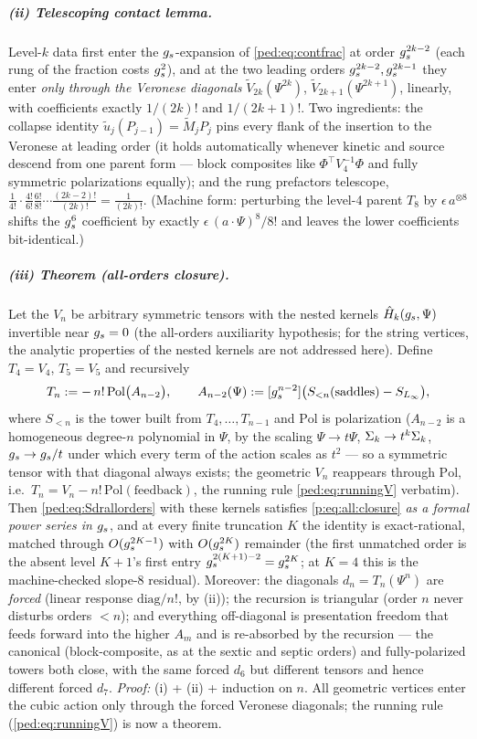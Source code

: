 \subparagraph{(ii) Telescoping contact lemma.} Level-$k$ data first enter the
$g_s$-expansion of \eqref{ped:eq:contfrac} at order $g_s^{2k-2}$ (each rung of the
fraction costs $g_s^2$), and at the two leading orders $g_s^{2k-2},g_s^{2k-1}$ they
enter \emph{only through the Veronese diagonals} $\tilde V_{2k}(\Psi^{2k})$,
$\tilde V_{2k+1}(\Psi^{2k+1})$, linearly, with coefficients exactly $1/(2k)!$ and
$1/(2k+1)!$. Two ingredients: the collapse identity $\tilde u_j(P_{j-1})=\tilde M_j
P_j$ pins every flank of the insertion to the Veronese at leading order (it holds
automatically whenever kinetic and source descend from one parent form --- block
composites like $\Phi^\top V_4^{-1}\Phi$ and fully symmetric polarizations equally);
and the rung prefactors telescope,
$\tfrac1{4!}\cdot\tfrac{4!}{6!}\tfrac{6!}{8!}\cdots\tfrac{(2k-2)!}{(2k)!}
=\tfrac1{(2k)!}$. (Machine form: perturbing the level-4 parent $T_8$ by
$\epsilon\,a^{\otimes8}$ shifts the $g_s^6$ coefficient by exactly
$\epsilon\,(a\!\cdot\!\Psi)^8/8!$ and leaves the lower coefficients bit-identical.)

\subparagraph{(iii) Theorem (all-orders closure).} Let the $V_n$ be arbitrary symmetric
tensors with the nested kernels $\hat H_k(g_s,\Psi)$ invertible near $g_s=0$ (the
all-orders auxiliarity hypothesis; for the string vertices, the analytic properties of
the nested kernels are not addressed here). Define
$T_4=V_4$, $T_5=V_5$ and recursively
\begin{equation}
	T_n := -\,n!\,\mathrm{Pol}\big(A_{n-2}\big),\qquad
	A_{n-2}(\Psi) := [g_s^{n-2}]\big(S_{<n}(\text{saddles})-S_{L_\infty}\big),
	\label{ped:eq:diagrec}
\end{equation}
where $S_{<n}$ is the tower built from $T_4,\dots,T_{n-1}$ and $\mathrm{Pol}$ is
polarization ($A_{n-2}$ is a homogeneous degree-$n$ polynomial in $\Psi$, by the
scaling $\Psi\to t\Psi$, $\Sigma_k\to t^k\Sigma_k$, $g_s\to g_s/t$ under which every term
of the action scales as $t^2$ --- so a symmetric tensor with that diagonal always
exists; the geometric $V_n$ reappears through $\mathrm{Pol}$, i.e.\
$T_n=V_n-n!\,\mathrm{Pol}(\text{feedback})$, the running rule \eqref{ped:eq:runningV}
verbatim). Then \eqref{ped:eq:Sdrallorders} with these kernels satisfies
\eqref{p:eq:all:closure} \emph{as a formal power series in $g_s$}, and at every finite
truncation $K$ the identity is exact-rational, matched through $O(g_s^{2K-1})$ with
$O(g_s^{2K})$ remainder (the first unmatched order is the absent level $K+1$'s first
entry $g_s^{2(K+1)-2}=g_s^{2K}$; at $K=4$ this is the machine-checked slope-$8$
residual).
Moreover: the diagonals $d_n=T_n(\Psi^n)$ are \emph{forced} (linear response
$\mathrm{diag}/n!$, by (ii)); the recursion is triangular (order $n$ never disturbs
orders $<n$); and everything off-diagonal is presentation freedom that feeds forward
into the higher $A_m$ and is re-absorbed by the recursion --- the canonical
(block-composite, as at the sextic and septic orders) and fully-polarized towers both
close, with the same forced $d_6$ but different tensors and hence different forced
$d_7$. \emph{Proof:} (i) + (ii) + induction on $n$. All geometric vertices enter the cubic
action only through the forced Veronese diagonals; the running rule (\cref{ped:eq:runningV}) is now a theorem.

